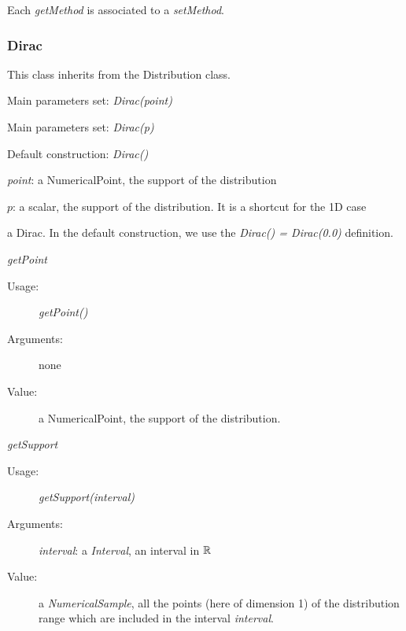 Each  \textit{getMethod}  is associated to a \textit{setMethod}.


\newpage
\subsubsection{Dirac}

This class inherits from the Distribution class.

\begin{description}

\item[Usage:]\rule{0pt}{1em}
\begin{description}
\item Main parameters set: \textit{Dirac(point)}
\item Main parameters set: \textit{Dirac(p)}
\item Default construction: \textit{Dirac()}
\end{description}

\item[Arguments:]  \rule{0pt}{1em}
\begin{description}
\item \textit{point}: a NumericalPoint, the support of the distribution
\item $p$: a scalar, the support of the distribution. It is a shortcut for the 1D case
\end{description}

\item[Value:] a Dirac. In the default construction, we use the \textit{Dirac() = Dirac(0.0)} definition.

\item[Some methods:] \rule{0pt}{1em}
\begin{description}

\item \textit{getPoint}
\begin{description}
\item[Usage:] \textit{getPoint()}
\item[Arguments:] none
\item[Value:]  a NumericalPoint, the support of the distribution.
\end{description}
\bigskip

\item \textit{getSupport}
\begin{description}
\item[Usage:] \textit{getSupport(interval)}
\item[Arguments:] \textit{interval}: a \textit{Interval}, an interval in ${\mathbb R}$
\item[Value:]  a \textit{NumericalSample}, all the points (here of dimension 1) of the distribution range which are included in the interval \textit{interval}.
\end{description}


\end{description}
\end{description}
